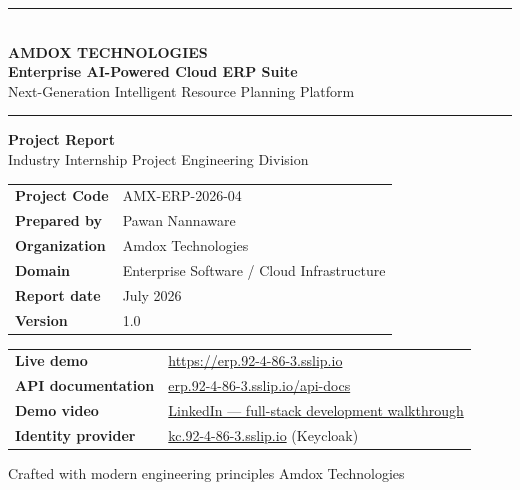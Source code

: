 \documentclass[11pt,a4paper]{article}
\newcommand{\liveurl}{\url{https://erp.92-4-86-3.sslip.io}}
\begin{document}
\begin{titlepage}
  \centering
  \vspace*{1.2cm}
  {\color{amdoxnavy}\rule{\textwidth}{2.2pt}}\\[0.9cm]
  {\Huge\bfseries\color{amdoxnavy} AMDOX TECHNOLOGIES}\\[0.45cm]
  {\LARGE\bfseries\color{amdoxblue} Enterprise AI-Powered Cloud ERP Suite}\\[0.35cm]
  {\large Next-Generation Intelligent Resource Planning Platform}\\[0.25cm]
  {\color{amdoxnavy}\rule{\textwidth}{2.2pt}}

  \vspace{1.4cm}
  {\Large\bfseries Project Report}\\[0.3cm]
  {\large Industry Internship Project \;\textbullet\; Engineering Division}

  \vspace{1.2cm}
  \renewcommand{\arraystretch}{1.5}
  \begin{tabular}{>{\bfseries}p{4.2cm} p{9.2cm}}
    \rowcolor{amdoxlight} Project Code    & AMX-ERP-2026-04 \\
    Prepared by                            & Pawan Nannaware \\
    \rowcolor{amdoxlight} Organization    & Amdox Technologies \\
    Domain                                 & Enterprise Software / Cloud Infrastructure \\
    \rowcolor{amdoxlight} Report date     & July 2026 \\
    Version                                & 1.0 \\
  \end{tabular}

  \vspace{1.2cm}
  \renewcommand{\arraystretch}{1.5}
  \begin{tabular}{>{\bfseries}p{4.2cm} p{9.2cm}}
     Live demo       & \liveurl \\
    API documentation                      & \href{https://erp.92-4-86-3.sslip.io/api-docs}{erp.92-4-86-3.sslip.io/api-docs} \\
     Demo video      & \href{https://www.linkedin.com/posts/agrim-gupta-b37748332_erp-fullstackdevelopment-reactjs-ugcPost-7481983427156631552-w-5k/?utm_source=share&utm_medium=member_desktop&rcm=ACoAAFPCdFsBaSccFtDfF9mn4gnwbJkh_GYpYrU}{LinkedIn --- full-stack development walkthrough} \\
    Identity provider                      & \href{https://kc.92-4-86-3.sslip.io}{kc.92-4-86-3.sslip.io} (Keycloak) \\
  \end{tabular}

  \vfill
  {\small\color{gray} Crafted with modern engineering principles \;\textbullet\; Amdox Technologies \;\textbullet{}}
\end{titlepage}
\end{document}
